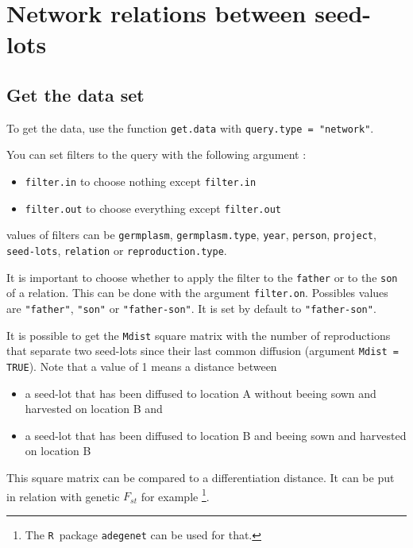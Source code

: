 \documentclass{article}\usepackage[]{graphicx}\usepackage[]{color}
\newcommand{\R}{\texttt{R}}
\renewcommand{\sl}{seed-lots}
\begin{document}
\section{Network relations between \sl }
\label{network}

\subsection{Get the data set}

To get the data, use the function \texttt{get.data} with \texttt{query.type = "network"}.

You can set filters to the query with the following argument :

\begin{itemize}
\item \texttt{filter.in} to choose nothing except \texttt{filter.in}
\item \texttt{filter.out} to choose everything except \texttt{filter.out}
\end{itemize}

values of filters can be \texttt{germplasm}, \texttt{germplasm.type}, \texttt{year}, \texttt{person}, \texttt{project}, \texttt{\sl}, \texttt{relation} or \texttt{reproduction.type}.


It is important to choose whether to apply the filter to the \texttt{father} or to the \texttt{son} of a relation.
This can be done with the argument \texttt{filter.on}.
Possibles values are \texttt{"father"}, \texttt{"son"} or \texttt{"father-son"}.
It is set by default to \texttt{"father-son"}.

It is possible to get the \texttt{Mdist} square matrix with the number of reproductions that separate two seed-lots since their last common diffusion (argument \texttt{Mdist = TRUE}).
Note that a value of 1 means a distance between 
\begin{itemize}
	\item a seed-lot that has been diffused to location A without beeing sown and harvested on location B and
	\item a seed-lot that has been diffused to location B and beeing sown and harvested on location B
\end{itemize}

This square matrix can be compared to a differentiation distance. 
It can be put in relation with genetic $F_{st}$ for example \citep{nei_analysis_1973}\footnote{The \R~package \texttt{adegenet} can be used for that.}.
\end{document}
